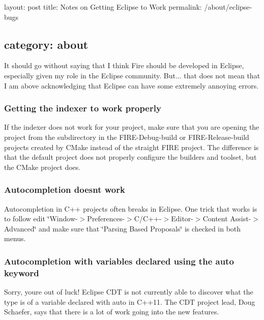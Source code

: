 

 layout\+: post title\+: Notes on Getting Eclipse to Work permalink\+: /about/eclipse-\/bugs \subsection*{category\+: about }

It should go without saying that I think Fire should be developed in Eclipse, especially given my role in the Eclipse community. But... that does not mean that I am above acknowledging that Eclipse can have some extremely annoying errors.

\subsubsection*{Getting the indexer to work properly}

If the indexer does not work for your project, make sure that you are opening the project from the subdirectory in the F\+I\+R\+E-\/\+Debug-\/build or F\+I\+R\+E-\/\+Release-\/build projects created by C\+Make instead of the straight F\+I\+RE project. The difference is that the default project does not properly configure the builders and toolset, but the C\+Make project does.

\subsubsection*{Autocompletion doesn\textquotesingle{}t work}

Autocompletion in C++ projects often breaks in Eclipse. One trick that works is to follow edit \char`\"{}\+Window-\/$>$\+Preferences-\/$>$\+C/\+C++-\/$>$\+Editor-\/$>$\+Content Assist-\/$>$\+Advanced\char`\"{} and make sure that \char`\"{}\+Parsing Based Proposals\char`\"{} is checked in both menus.

\subsubsection*{Autocompletion with variables declared using the auto keyword}

Sorry, you\textquotesingle{}re out of luck! Eclipse C\+DT is not currently able to discover what the type is of a variable declared with auto in C++11. The C\+DT project lead, Doug Schaefer, says that there is a lot of work going into the new features. 